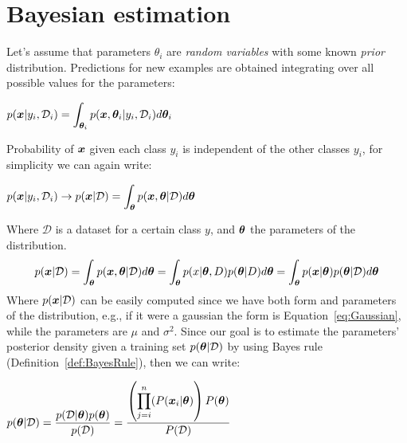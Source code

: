 \section{Bayesian estimation}
\label{sec:BayesEstimation}
\newcommand{\best}[1]{beasyan estimation~}
\newcommand{\Best}[1]{beasyan estimation~}
Let's assume that parameters $\theta_i$ are \textit{random variables} with some known \textit{prior} distribution. \newline
Predictions for new examples are obtained integrating over all possible values for the parameters:
\begin{center}
	$\displaystyle p(\bm{x}\vert y_i, \mathcal{D}_i)=\int_{\bm{\theta}_i}p(\bm{x},\bm{\theta}_i\vert y_i,\mathcal{D}_i)d\bm{\theta}_i$
\end{center}
Probability of $\bm{x}$ given each class $y_i$ is independent of the other classes $y_i$, for simplicity we can again write:
\begin{center}
	$\displaystyle p(\bm{x}\vert y_i, \mathcal{D}_i)\rightarrow p(\bm{x}\vert\mathcal{D})=\int_{\bm{\theta}}p(\bm{x},\bm{\theta}\vert \mathcal{D})d\bm{\theta}$
\end{center}
Where $\mathcal{D}$ is a dataset for a certain class $y$, and $\bm{\theta}$ the parameters of the distribution. \newline
\begin{equation}
	p(\bm{x}\vert\mathcal{D})=\int_{\bm{\theta}}p(\bm{x},\bm{\theta}\vert\mathcal{D})d\bm{\theta}=\int_{\bm{\theta}} p(x\vert\bm{\theta}, D)p(\bm{\theta}\vert D)d\bm{\theta}=\int_{\bm{\theta}}p(\bm{x}\vert\bm{\theta})p(\bm{\theta}\vert\mathcal{D})d\bm{\theta}
	\label{eq:classConditionalDensity}
\end{equation}
Where $p(\bm{x}\vert\mathcal{D})$ can be easily computed since we have both form and parameters of the distribution, e.g., if it were a gaussian the form is Equation~\ref{eq:Gaussian}, while the parameters are $\mu$ and $\sigma^2$. \newline
Since our goal is to estimate the parameters' posterior density given a training set $p(\bm{\theta}\vert\mathcal{D})$ by using Bayes rule (Definition~\ref{def:BayesRule}), then we can write:
\begin{center}
	$\displaystyle p(\bm{\theta}\vert \mathcal{D})=\frac{p(\mathcal{D}\vert\bm{\theta})p(\bm{\theta})}{p(\mathcal{D})}=\frac{\left(\displaystyle\prod_{j=i}^n(P(\bm{x}_i\vert \bm{\bm{\theta}})\right)P(\bm{\theta})}{P(\mathcal{D})}$
\end{center}

